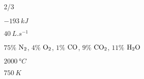 \documentclass[braun, twocolumn]{braun}
\begin{document}
\begin{answers}
\item 2/3

\item $\qty{-193}{kJ}$

\item 

\begin{answers}

\item $\qty{40}{L.s^{-1}}$

\item $75\%$ $\ce{N2}$, $4\%$ $\ce{O2}$, $1\%$ $\ce{CO}$, $9\%$ $\ce{CO2}$,
$11\%$ $\ce{H2O}$

\item $\qty{2000}{\degree C}$

\item $\qty{750}{K}$

\end{answers}

\end{answers}
\end{document}
